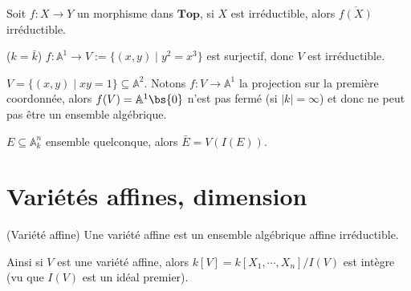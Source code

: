         \begin{exo}
            Soit $f : X \to Y$ un morphisme dans $\mathbf{Top}$, si $X$ est irréductible, alors $\overline{f(X)}$ irréductible.
        \end{exo}
        \begin{expl}
            ($k = \bar k$) $f : \mathbb{A}^1 \to V := \{(x,y) \mid y^2 = x^3\}$ est surjectif, donc $V$ est irréductible.
        \end{expl}
        \begin{expl}
            $V = \{(x,y) \mid xy = 1\} \subseteq \mathbb{A}^2$. Notons $f : V \to \mathbb{A}^1$ la projection sur la première coordonnée, alors $f(V) = \mathbb{A}^1 \bs \{0\}$ n'est pas fermé (si $|k| = \infty$) et donc ne peut pas être un ensemble algébrique.
        \end{expl}
        \begin{exo}
            $E \subseteq \mathbb{A}^n_k$ ensemble quelconque, alors $\bar E = V(I(E))$. 
        \end{exo}

    \section{Variétés affines, dimension}
        \begin{defi} (Variété affine)
            Une variété affine est un ensemble algébrique affine irréductible.
        \end{defi}
        Ainsi si $V$ est une variété affine, alors $k[V] = k[X_1, \cdots, X_n]/I(V)$ est intègre (vu que $I(V)$ est un idéal premier).
